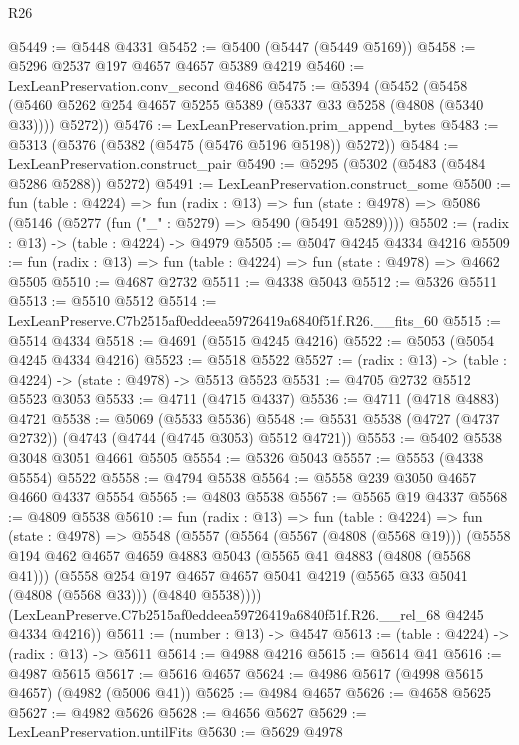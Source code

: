 \begin{lexlean}{R26}
\begin{coremodule}
@5449 := @5448 @4331
@5452 := @5400 (@5447 (@5449 @5169))
@5458 := @5296 @2537 @197 @4657 @4657 @5389 @4219
@5460 := LexLeanPreservation.conv_second @4686
@5475 := @5394
    (@5452 (@5458 (@5460 @5262 @254 @4657 @5255 @5389 (@5337 @33 @5258 (@4808 (@5340 @33)))) @5272))
@5476 := LexLeanPreservation.prim_append_bytes
@5483 := @5313 (@5376 (@5382 (@5475 (@5476 @5196 @5198)) @5272))
@5484 := LexLeanPreservation.construct_pair
@5490 := @5295 (@5302 (@5483 (@5484 @5286 @5288)) @5272)
@5491 := LexLeanPreservation.construct_some
@5500 := fun (table : @4224) =>
  fun (radix : @13) =>
  fun (state : @4978) => @5086 (@5146 (@5277 (fun ("_" : @5279) => @5490 (@5491 @5289))))
@5502 := (radix : @13) -> (table : @4224) -> @4979
@5505 := @5047 @4245 @4334 @4216
@5509 := fun (radix : @13) => fun (table : @4224) => fun (state : @4978) => @4662 @5505
@5510 := @4687 @2732
@5511 := @4338 @5043
@5512 := @5326 @5511
@5513 := @5510 @5512
@5514 := LexLeanPreserve.C7b2515af0eddeea59726419a6840f51f.R26.__fits_60
@5515 := @5514 @4334
@5518 := @4691 (@5515 @4245 @4216)
@5522 := @5053 (@5054 @4245 @4334 @4216)
@5523 := @5518 @5522
@5527 := (radix : @13) -> (table : @4224) -> (state : @4978) -> @5513 @5523
@5531 := @4705 @2732 @5512 @5523 @3053
@5533 := @4711 (@4715 @4337)
@5536 := @4711 (@4718 @4883) @4721
@5538 := @5069 (@5533 @5536)
@5548 := @5531 @5538 (@4727 (@4737 @2732)) (@4743 (@4744 (@4745 @3053) @5512 @4721))
@5553 := @5402 @5538 @3048 @3051 @4661 @5505
@5554 := @5326 @5043
@5557 := @5553 (@4338 @5554) @5522
@5558 := @4794 @5538
@5564 := @5558 @239 @3050 @4657 @4660 @4337 @5554
@5565 := @4803 @5538
@5567 := @5565 @19 @4337
@5568 := @4809 @5538
@5610 := fun (radix : @13) =>
  fun (table : @4224) =>
  fun (state : @4978) =>
  @5548
    (@5557
      (@5564
        (@5567 (@4808 (@5568 @19)))
        (@5558
          @194
          @462
          @4657
          @4659
          @4883
          @5043
          (@5565 @41 @4883 (@4808 (@5568 @41)))
          (@5558
            @254
            @197
            @4657
            @4657
            @5041
            @4219
            (@5565 @33 @5041 (@4808 (@5568 @33)))
            (@4840 @5538))))
      (LexLeanPreserve.C7b2515af0eddeea59726419a6840f51f.R26.__rel_68 @4245 @4334 @4216))
@5611 := (number : @13) -> @4547
@5613 := (table : @4224) -> (radix : @13) -> @5611
@5614 := @4988 @4216
@5615 := @5614 @41
@5616 := @4987 @5615
@5617 := @5616 @4657
@5624 := @4986 @5617 (@4998 @5615 @4657) (@4982 (@5006 @41))
@5625 := @4984 @4657
@5626 := @4658 @5625
@5627 := @4982 @5626
@5628 := @4656 @5627
@5629 := LexLeanPreservation.untilFits
@5630 := @5629 @4978

\end{coremodule}
\end{lexlean}
